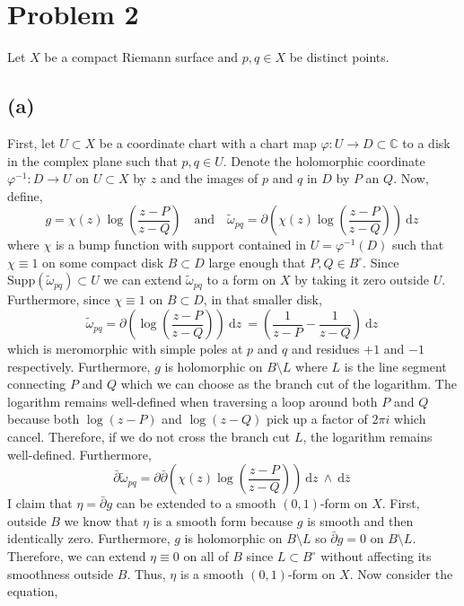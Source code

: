 \documentclass[12pt]{extarticle}
\newcommand{\C}{\mathbb{C}}
\renewcommand{\d}[1]{\: \mathrm{d}#1 \:}
\theoremstyle{definition}
\newcommand{\supp}[1]{\mathrm{Supp}\left(#1\right)}
\begin{document}
\section*{Problem 2}

Let $X$ be a compact Riemann surface and $p, q \in X$ be distinct points. 

\subsection*{(a)}

First, let $U \subset X$ be a coordinate chart with a chart map $\varphi : U \to D \subset \C$ to a disk in the complex plane such that $p, q \in U$. Denote the holomorphic coordinate $\varphi^{-1} : D \to U$ on $U \subset X$ by $z$ and the images of $p$ and $q$ in $D$ by $P$ an $Q$. Now, define,
\[  g =  \chi(z) \log{\left( \frac{z - P}{z - Q} \right)} \quad \text{and} \quad \tilde{\omega}_{pq} = \partial \left( \chi(z) \log{\left( \frac{z - P}{z - Q} \right)} \right) \d{z} \] 
where $\chi$ is a bump function with support contained in $U = \varphi^{-1}(D)$ such that $\chi \equiv 1$ on some compact disk $B \subset D$ large enough that $P, Q \in B^\circ$. Since $\supp{\tilde{\omega}_{pq}} \subset U$ we can extend $\tilde{\omega}_{pq}$ to a form on $X$ by taking it zero outside $U$. Furthermore, since $\chi \equiv 1$ on $B \subset D$, in that smaller disk,
\[ \tilde{\omega}_{pq} =  \partial \left( \log{\left( \frac{z - P}{z - Q} \right)} \right) \d{z} = \left( \frac{1}{z - P} - \frac{1}{z - Q} \right) \d{z} \]
which is meromorphic with simple poles at $p$ and $q$ and residues $+1$ and $-1$ respectively.
Furthermore, $g$ is holomorphic on $B \setminus L$ where $L$ is the line segment connecting $P$ and $Q$ which we can choose as the branch cut of the logarithm. The logarithm remains well-defined when traversing a loop around both $P$ and $Q$ because both $\log{(z - P)}$ and $\log{(z - Q)}$  pick up a factor of $2 \pi i$ which cancel. Therefore, if we do not cross the branch cut $L$, the logarithm remains well-defined. Furthermore,
\[ \bar{\partial} \tilde{\omega}_{pq} = \partial \bar{\partial} \left( \chi(z) \log{\left( \frac{z - P}{z - Q} \right)} \right) \d{z} \wedge \d{\bar{z}} \]
I claim that $\eta = \bar{\partial} g$
can be extended to a smooth $(0,1)$-form on $X$. First, outside $B$ we know that $\eta$ is a smooth form because $g$ is smooth and then identically zero. Furthermore, $g$ is holomorphic on $B \setminus L$ so $\bar{\partial} g = 0$ on $B \setminus L$. Therefore, we can extend $\eta \equiv 0$ on all of $B$ since $L \subset B^\circ$ without affecting its smoothness outside $B$. Thus, $\eta$ is a smooth $(0, 1)$-form on $X$. Now consider the equation,
\end{document}
